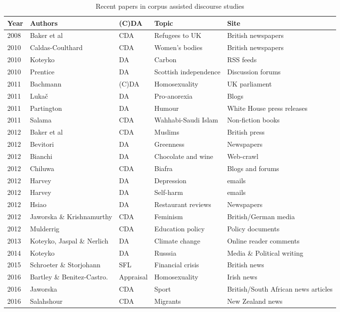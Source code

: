 \begin{table}[htb] 
\centering
\resizebox{12cm}{!} {
\begin{tabular}{lllll}

\toprule
Year & Authors & (C)DA & Topic & Site \\ \midrule
2008 & Baker et al & \gls{CDA} & Refugees to UK & British newspapers \\ 
2010 & Caldas-Coulthard & \gls{CDA} & Women's bodies & British newspapers \\  
2010 & Koteyko & DA & Carbon & RSS feeds \\ 
2010 & Prentice & DA & Scottish independence & Discussion forums \\  
2011 & Bachmann & (C)DA & Homosexuality & UK parliament \\  
2011 & Luka\v{c} & DA & Pro-anorexia & Blogs \\  
2011 & Partington & DA & Humour & White House press releases \\  
2011 & Salama & \gls{CDA} & Wahhabi-Saudi Islam & Non-fiction books \\  
2012 & Baker et al & \gls{CDA} & Muslims & British press \\  
2012 & Bevitori & DA & Greenness & Newspapers \\  2012 & Bianchi & DA & Chocolate and wine & Web-crawl \\
2012 & Chiluwa & \gls{CDA} & Biafra & Blogs and forums \\  
2012 & Harvey & DA & Depression & emails \\  
2012 & Harvey & DA & Self-harm & emails \\
2012 & Hsiao & DA & Restaurant reviews & Newspapers \\  
2012 & Jaworska \& Krishnamurthy & \gls{CDA} & Feminism & British\slash German media \\ 
2012 & Mulderrig & \gls{CDA} & Education policy & Policy documents \\  
2013 & Koteyko, Jaspal \& Nerlich & DA & Climate change & Online reader comments \\
2014 & Koteyko & DA & Russsia & Media \& Political writing \\
2015 & Schroeter \& Storjohann & SFL & Financial crisis & British news \\
2016 & Bartley \& Benitez-Castro. & Appraisal & Homosexuality & Irish news \\
2016 & Jaworska & CDA & Sport & British\slash South African news articles \\ 
2016 & Salahshour & CDA & Migrants & New Zealand news \\
\bottomrule  \end{tabular} }  
\caption[Recent papers in CADS]{Recent papers in corpus assisted discourse studies}
\label{table:cads} 
\end{table}

